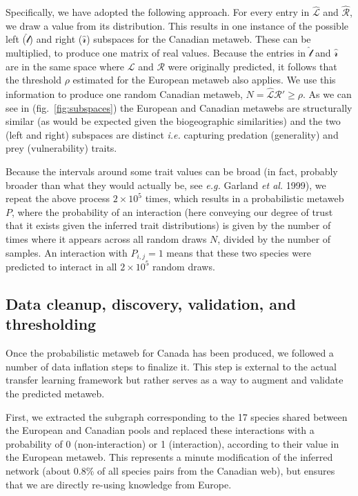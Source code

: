 \documentclass[11pt]{article}
\begin{document}
Specifically, we have adopted the following approach. For every entry in
\(\hat{\mathscr{L}}\) and \(\hat{\mathscr{R}}\), we draw a value from
its distribution. This results in one instance of the possible left
(\(\hat{\mathscr{l}}\)) and right (\(\hat{\mathscr{r}}\)) subspaces for
the Canadian metaweb. These can be multiplied, to produce one matrix of
real values. Because the entries in \(\hat{\mathscr{l}}\) and
\(\hat{\mathscr{r}}\) are in the same space where \(\mathscr{L}\) and
\(\mathscr{R}\) were originally predicted, it follows that the threshold
\(\rho\) estimated for the European metaweb also applies. We use this
information to produce one random Canadian metaweb,
\(N = \hat{\mathscr{L}}\)\(\hat{\mathscr{R}}' \ge \rho\). As we can see
in (fig.~\ref{fig:subspaces}) the European and Canadian metawebs are
structurally similar (as would be expected given the biogeographic
similarities) and the two (left and right) subspaces are distinct
\emph{i.e.} capturing predation (generality) and prey (vulnerability)
traits.

Because the intervals around some trait values can be broad (in fact,
probably broader than what they would actually be, see \emph{e.g.}
Garland \emph{et al.} 1999), we repeat the above process
\(2\times 10^5\) times, which results in a probabilistic metaweb \(P\),
where the probability of an interaction (here conveying our degree of
trust that it exists given the inferred trait distributions) is given by
the number of times where it appears across all random draws \(N\),
divided by the number of samples. An interaction with \(P_{i,j} = 1\)
means that these two species were predicted to interact in all
\(2\times 10^5\) random draws.

\hypertarget{data-cleanup-discovery-validation-and-thresholding}{%
\subsection{Data cleanup, discovery, validation, and
thresholding}\label{data-cleanup-discovery-validation-and-thresholding}}

Once the probabilistic metaweb for Canada has been produced, we followed
a number of data inflation steps to finalize it. This step is external
to the actual transfer learning framework but rather serves as a way to
augment and validate the predicted metaweb.

First, we extracted the subgraph corresponding to the 17 species shared
between the European and Canadian pools and replaced these interactions
with a probability of 0 (non-interaction) or 1 (interaction), according
to their value in the European metaweb. This represents a minute
modification of the inferred network (about 0.8\% of all species pairs
from the Canadian web), but ensures that we are directly re-using
knowledge from Europe.
\end{document}
